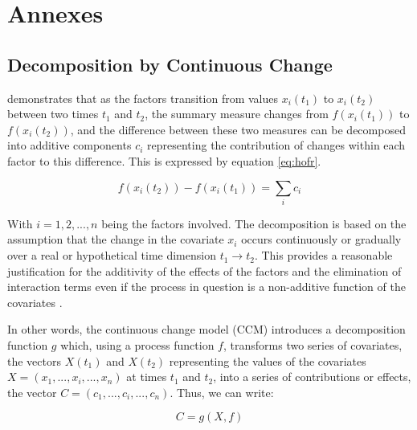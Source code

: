 \section{Annexes}

\subsection{Decomposition by Continuous Change}

\vspace{0.7em}\par
\citet{horiuchiDecompositionMethodBased2008} demonstrates that as the factors transition from values \(x_i(t_1)\) to \(x_i(t_2)\) between two times \(t_1\) and \(t_2\), the summary measure changes from \(f(x_i(t_1))\) to \(f(x_i(t_2))\), and the difference between these two measures can be decomposed into additive components \(c_{i}\) representing the contribution of changes within each factor to this difference. This is expressed by equation \eqref{eq:hofr}.

\begin{equation} \label{eq:hofr}
    f(x_i(t_2)) - f(x_i(t_1)) = \displaystyle\sum_{i}c_{i}
\end{equation}

\vspace{0.7em}\par
With \(i = 1, 2, ..., n\) being the factors involved. The decomposition is based on the assumption that the change in the covariate \(x_i\) occurs continuously or gradually over a real or hypothetical time dimension \(t_1 \rightarrow t_2\). This provides a reasonable justification for the additivity of the effects of the factors and the elimination of interaction terms even if the process in question is a non-additive function of the covariates \citep[p.~786]{horiuchiDecompositionMethodBased2008}.

\vspace{0.7em}\par
In other words, the continuous change model (CCM) introduces a decomposition function \(g\) which, using a process function \(f\), transforms two series of covariates, the vectors \(X(t_1)\) and \(X(t_2)\) representing the values of the covariates \(X = (x_1, ..., x_i, ..., x_n)\) at times \(t_1\) and \(t_2\), into a series of contributions or effects, the vector \(C = (c_1, ..., c_i, ..., c_n)\). Thus, we can write:

\begin{equation}\label{eq:gfr}
    C = g(X, f)
\end{equation}

